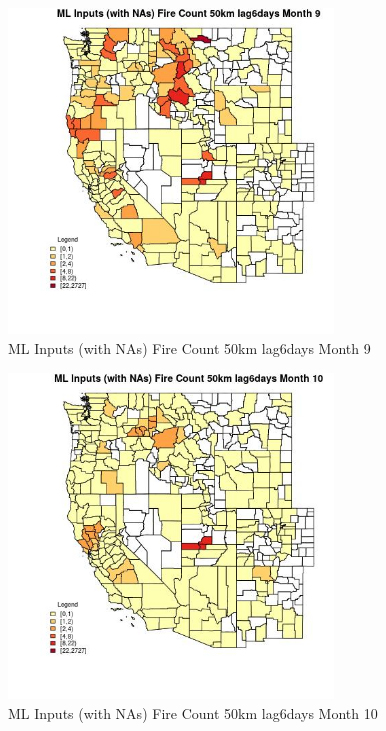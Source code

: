 \begin{figure} 
\centering  
\includegraphics[width=0.77\textwidth]{Code_Outputs/Report_ML_input_PM25_Step4_part_f_de_duplicated_aveswNAs_CountyFire_Count_50km_lag6daysmedianMonth9.jpg} 
\caption{\label{fig:Report_ML_input_PM25_Step4_part_f_de_duplicated_aveswNAsCountyFire_Count_50km_lag6daysmedianMonth9}ML Inputs (with NAs) Fire Count 50km lag6days Month 9} 
\end{figure} 
 

\begin{figure} 
\centering  
\includegraphics[width=0.77\textwidth]{Code_Outputs/Report_ML_input_PM25_Step4_part_f_de_duplicated_aveswNAs_CountyFire_Count_50km_lag6daysmedianMonth10.jpg} 
\caption{\label{fig:Report_ML_input_PM25_Step4_part_f_de_duplicated_aveswNAsCountyFire_Count_50km_lag6daysmedianMonth10}ML Inputs (with NAs) Fire Count 50km lag6days Month 10} 
\end{figure} 
 

